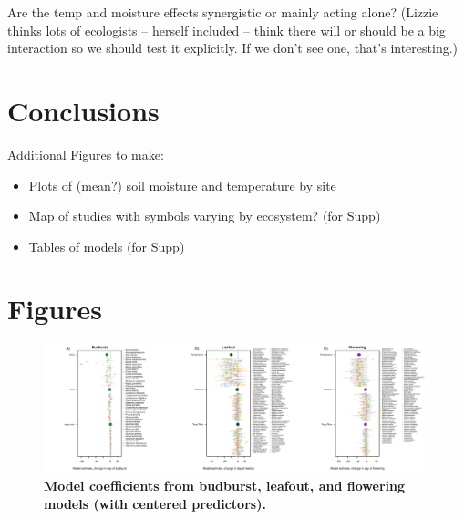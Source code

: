 \documentclass{article}
\begin{document}
\par Are the temp and moisture effects synergistic or mainly acting alone? (Lizzie thinks lots of ecologists -- herself included -- think there will or should be a big interaction so we should test it explicitly. If we don't see one, that's interesting.)


\section* {Conclusions}

\par Additional Figures to make:
 \begin{itemize}
 \item Plots of (mean?) soil moisture and temperature by site
 \item Map of studies with symbols varying by ecosystem? (for Supp)
\item Tables of models (for Supp)
\end{itemize}



\section*{Figures}

\begin{figure}[h]
\centering
 \includegraphics{../../Analyses/soilmoisture/figures/m5_bbdlofl.pdf}
 \caption{\textbf{Model coefficients from budburst, leafout, and flowering models (with centered predictors).}} 
 \label{fig:bblofl}
 \end{figure}
 
 
\end{document}
